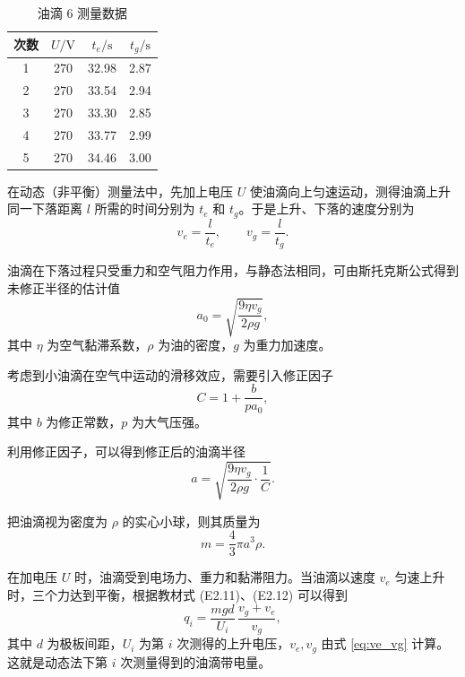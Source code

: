\documentclass[a4paper,8pt,twocolumn]{article}
\begin{document}
\begin{table}[H]
\centering
\caption{油滴 6 测量数据}
\begin{tabular}{cccc}
\hline
次数 & $U/\mathrm{V}$ & $t_e/\mathrm{s}$ & $t_g/\mathrm{s}$ \\
\hline
1 & 270 & 32.98 & 2.87 \\
2 & 270 & 33.54 & 2.94 \\
3 & 270 & 33.30 & 2.85 \\
4 & 270 & 33.77 & 2.99 \\
5 & 270 & 34.46 & 3.00 \\
\hline
\end{tabular}
\end{table}


在动态（非平衡）测量法中，先加上电压 $U$ 使油滴向上匀速运动，测得油滴上升同一下落距离 $l$ 所需的时间分别为 $t_e$ 和 $t_g$。于是上升、下落的速度分别为
\begin{equation}
  v_e = \frac{l}{t_e}, \qquad
  v_g = \frac{l}{t_g}. \label{eq:ve_vg}
\end{equation}

油滴在下落过程只受重力和空气阻力作用，与静态法相同，可由斯托克斯公式得到未修正半径的估计值
\begin{equation}
  a_0 = \sqrt{\frac{9\eta v_g}{2\rho g}},
\end{equation}
其中 $\eta$ 为空气黏滞系数，$\rho$ 为油的密度，$g$ 为重力加速度。

考虑到小油滴在空气中运动的滑移效应，需要引入修正因子
\begin{equation}
  C = 1+\frac{b}{p a_0},
\end{equation}
其中 $b$ 为修正常数，$p$ 为大气压强。

利用修正因子，可以得到修正后的油滴半径
\begin{equation}
  a = \sqrt{\frac{9\eta v_g}{2\rho g}\cdot\frac{1}{C}}.
\end{equation}

把油滴视为密度为 $\rho$ 的实心小球，则其质量为
\begin{equation}
  m = \frac{4}{3}\pi a^3 \rho .
\end{equation}

在加电压 $U$ 时，油滴受到电场力、重力和黏滞阻力。当油滴以速度 $v_e$ 匀速上升时，三个力达到平衡，根据教材式 (E2.11)、(E2.12) 可以得到
\begin{equation}
  q_i = \frac{m g d}{U_i}\,\frac{v_g + v_e}{v_g},
\end{equation}
其中 $d$ 为极板间距，$U_i$ 为第 $i$ 次测得的上升电压，$v_e,v_g$ 由式 \eqref{eq:ve_vg} 计算。这就是动态法下第 $i$ 次测量得到的油滴带电量。
\end{document}

